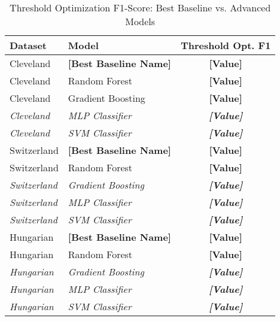 \documentclass{article}
\begin{document}
\begin{table}[htbp]
\centering
\caption{Threshold Optimization F1-Score: Best Baseline vs. Advanced Models}
\label{tab:advanced_comparison_thresh_opt}
\begin{tabular}{llc}
\toprule
Dataset     & Model                & Threshold Opt. F1 \\
\midrule
Cleveland   & \textbf{[Best Baseline Name]} & \textbf{[Value]}    \\
Cleveland   & Random Forest        & \textbf{[Value]}    \\
Cleveland   & Gradient Boosting    & \textbf{[Value]}    \\
\textit{Cleveland} & \textit{MLP Classifier} & \textit{\textbf{[Value]}}    \\
\textit{Cleveland} & \textit{SVM Classifier} & \textit{\textbf{[Value]}}    \\
\midrule
Switzerland & \textbf{[Best Baseline Name]} & \textbf{[Value]}    \\
Switzerland & Random Forest        & \textbf{[Value]}    \\
\textit{Switzerland} & \textit{Gradient Boosting} & \textit{\textbf{[Value]}}    \\
\textit{Switzerland} & \textit{MLP Classifier} & \textit{\textbf{[Value]}}    \\
\textit{Switzerland} & \textit{SVM Classifier} & \textit{\textbf{[Value]}}    \\
\midrule
Hungarian   & \textbf{[Best Baseline Name]} & \textbf{[Value]}    \\
Hungarian   & Random Forest        & \textbf{[Value]}    \\
\textit{Hungarian} & \textit{Gradient Boosting} & \textit{\textbf{[Value]}}    \\
\textit{Hungarian} & \textit{MLP Classifier} & \textit{\textbf{[Value]}}    \\
\textit{Hungarian} & \textit{SVM Classifier} & \textit{\textbf{[Value]}}    \\
\bottomrule
\end{tabular}
\end{table}
\end{document}

